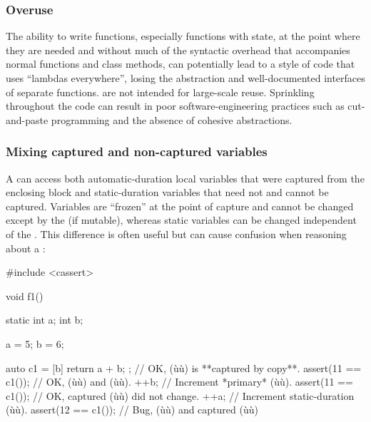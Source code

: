 \subsubsection[Overuse]{Overuse}\label{overuse}

The ability to write functions, especially functions with state, at the
point where they are needed and without much of the syntactic overhead
that accompanies normal functions and class methods, can potentially
lead to a style of code that uses ``lambdas everywhere'', losing the
abstraction and well-documented interfaces of separate functions.
 are not intended for large-scale reuse.
Sprinkling  throughout the code can result in
poor software-engineering practices such as cut-and-paste programming
and the absence of cohesive abstractions.

\subsubsection[Mixing captured and non-captured variables]{Mixing captured and non-captured variables}\label{mixing-captured-and-non-captured-variables}

A  can access both automatic-duration local
variables that were captured from the enclosing block and
static-duration variables that need not and cannot be captured.
Variables  are ``frozen'' at the point of
capture and cannot be changed except by the  (if
mutable), whereas static variables can be changed independent of the
. This difference is often useful but can
cause confusion when reasoning about a :

\begin{emcppslisting}
#include <cassert>

void f1()
{
    static int a;
    int        b;

    a = 5;
    b = 6;

    auto c1 = [b]{ return a + b; };  // OK, (ù{}ù) is **captured by copy**.
    assert(11 == c1());              // OK, (ù{}ù) and (ù{}ù).
    ++b;                             // Increment *primary* (ù{}ù).
    assert(11 == c1());              // OK, captured (ù{}ù) did not change.
    ++a;                             // Increment static-duration (ù{}ù).
    assert(12 == c1());              // Bug, (ù{}ù) and captured (ù{}ù)
}
\end{emcppslisting}
    

